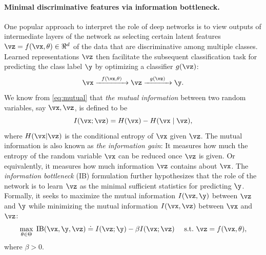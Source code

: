 \documentclass[../../book-main.tex]{subfiles}
\begin{document}
\paragraph{Minimal discriminative features via information bottleneck.}
One popular approach to interpret the role of deep networks is to
view outputs of intermediate layers of the network as selecting
certain latent features $\vz = f(\vx, \theta) \in \Re^d$ of the data
that are discriminative among multiple classes. Learned
representations $\vz$ then  facilitate the subsequent classification
task for predicting the class label $\y$ by optimizing a classifier $g(\vz)$:
\begin{equation}
    \vx   \xrightarrow{\hspace{2mm} f(\vx, \theta)\hspace{2mm}} \vz
    \xrightarrow{\hspace{2mm} g(\vz) \hspace{2mm}} \y.
\end{equation}
We know from \eqref{eq:mutual} that {\em the
mutual information} between two random variables, say $\vx,\vz$, is
defined to be
\begin{equation}
    I(\vx; \vz) = H(\vx) - H(\vx\mid \vz),
\end{equation}
where $H(\vx \vert \vz)$ is the conditional entropy of $\vx$ given $\vz$.
The mutual information is also known as {\em the information gain}:
It measures how much the entropy of the random variable $\vx$ can be
reduced once $\vz$ is given. Or equivalently, it measures how much
information $\vz$ contains about $\vx$.  The {\em information
bottleneck} (IB) formulation \cite{Tishby-ITW2015} further
hypothesizes that the role of the network is to learn $\vz$ as the
minimal sufficient statistics for predicting $\y$. Formally, it seeks
to maximize the mutual information $I(\vz, \y)$
between $\vz$ and $\y$ while minimizing the mutual information $I(\vx,
\vz)$ between $\vx$ and $\vz$:
\begin{equation}
    \max_{\theta\in \Theta}\; \mbox{IB}(\vx, \y, \vz) \doteq I(\vz; \y) -
    \beta I(\vx; \vz) \quad\ \mathrm{s.t.}\ \vz = f(\vx, \theta),
    \label{chap4-eqn:information-bottleneck}
\end{equation}
where $\beta >0$.
\end{document}
